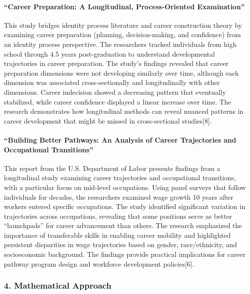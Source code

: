 \documentclass[./main.tex]{subfiles}
\begin{document}
\paragraph{``Career Preparation: A Longitudinal, Process-Oriented
Examination''}\label{career-preparation-a-longitudinal-process-oriented-examination}

This study bridges identity process literature and career construction
theory by examining career preparation (planning, decision-making, and
confidence) from an identity process perspective. The researchers
tracked individuals from high school through 4.5 years post-graduation
to understand developmental trajectories in career preparation. The
study's findings revealed that career preparation dimensions were not
developing similarly over time, although each dimension was associated
cross-sectionally and longitudinally with other dimensions. Career
indecision showed a decreasing pattern that eventually stabilized, while
career confidence displayed a linear increase over time. The research
demonstrates how longitudinal methods can reveal nuanced patterns in
career development that might be missed in cross-sectional
studies{[}8{]}.

\paragraph{``Building Better Pathways: An Analysis of Career
Trajectories and Occupational
Transitions''}\label{building-better-pathways-an-analysis-of-career-trajectories-and-occupational-transitions}

This report from the U.S. Department of Labor presents findings from a
longitudinal study examining career trajectories and occupational
transitions, with a particular focus on mid-level occupations. Using
panel surveys that follow individuals for decades, the researchers
examined wage growth 10 years after workers entered specific
occupations. The study identified significant variation in trajectories
across occupations, revealing that some positions serve as better
``launchpads'' for career advancement than others. The research
emphasized the importance of transferable skills in enabling career
mobility and highlighted persistent disparities in wage trajectories
based on gender, race/ethnicity, and socioeconomic background. The
findings provide practical implications for career pathway program
design and workforce development policies{[}6{]}.

\subsubsection{4. Mathematical Approach}\label{mathematical-approach}
\end{document}
